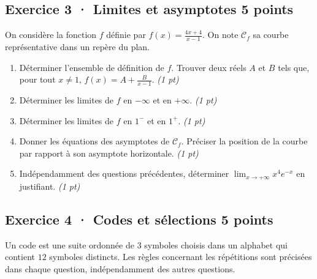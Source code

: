 \mxnewpage{}

\subsection*{Exercice 3 · Limites et asymptotes \hfill 5 points}On considère la fonction $f$ définie par $f(x)=\frac{4x+4}{x-1}$. On note $\mathcal C_f$ sa courbe représentative dans un repère du plan.

\begin{enumerate}

\item Déterminer l'ensemble de définition de $f$. Trouver deux réels $A$ et $B$ tels que, pour tout $x\ne1$, $f(x)=A+\frac B{x-1}$. \hfill\textit{(1 pt)}

\item Déterminer les limites de $f$ en $-\infty$ et en $+\infty$. \hfill\textit{(1 pt)}

\item Déterminer les limites de $f$ en $1^-$ et en $1^+$. \hfill\textit{(1 pt)}

\item Donner les équations des asymptotes de $\mathcal C_f$. Préciser la position de la courbe par rapport à son asymptote horizontale. \hfill\textit{(1 pt)}

\item Indépendamment des questions précédentes, déterminer $\displaystyle\lim_{x\to+\infty}x^{4}e^{-x}$ en justifiant. \hfill\textit{(1 pt)}

\end{enumerate}

\subsection*{Exercice 4 · Codes et sélections \hfill 5 points}Un code est une suite ordonnée de $3$ symboles choisis dans un alphabet qui contient $12$ symboles distincts. Les règles concernant les répétitions sont précisées dans chaque question, indépendamment des autres questions.

